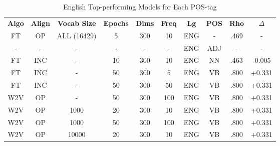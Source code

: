 \begin{table}[h]
\centering
\begin{tabular}{cccccccccc} 
\toprule
\textbf{ Algo } & \textbf{ Align } & \textbf{ Vocab Size } & \textbf{ Epochs } & \textbf{ Dims } & \textbf{ Freq} & \textbf{ Lg } & \textbf{ POS } & \textbf{ Rho } & \textbf{ $\Delta$ }  \\
FT              & OP               & ALL (16429)           & 5                 & 300             & 10             & ENG           & -              & .469           & -               \\
-               & -                & -                     & -                 & -               & -              & ENG           & ADJ            & -              & -               \\
FT              & INC              & -                     & 10                & 300             & 10             & ENG           & NN             & .463           & -0.005            \\
FT              & INC              & -                     & 50                & 300             & 5              & ENG           & VB             & .800           & +0.331            \\
FT              & INC              & -                     & 50                & 300             & 50             & ENG           & VB             & .800           & +0.331            \\
W2V             & OP               & -                     & 50                & 300             & 100            & ENG           & VB             & .800           & +0.331            \\
W2V             & OP               & 1000                  & 20                & 300             & 10             & ENG           & VB             & .800           & +0.331            \\
W2V             & OP               & 1000                  & 50                & 300             & 100            & ENG           & VB             & .800           & +0.331            \\
W2V             & OP               & 10000                 & 20                & 300             & 10             & ENG           & VB             & .800           & +0.331            \\
\bottomrule
\end{tabular}
\caption{English Top-performing Models for Each POS-tag}
\label{tab:eng-posresults}
\end{table}


